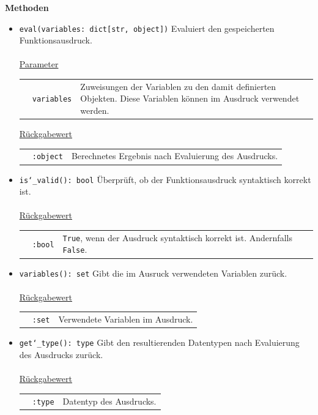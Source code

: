 \documentclass{article}
\begin{document}
\textbf{{Methoden}}
\begin{itemize}
\item \texttt{eval(variables: dict[str, object])} \newline Evaluiert den gespeicherten Funktionsausdruck.
\\\\
\underline{{Parameter}}

\begin{tabular}{lll}
 & \texttt{variables} & Zuweisungen der Variablen zu den damit definierten Objekten. Diese Variablen können im Ausdruck verwendet werden. \\
\end{tabular}

\underline{{Rückgabewert}}

\begin{tabular}{lll}
 & \texttt{:object} & Berechnetes Ergebnis nach Evaluierung des Ausdrucks. \\
\end{tabular}

\item \texttt{is\char`_valid(): bool} \newline Überprüft, ob der Funktionsausdruck syntaktisch korrekt ist.
\\\\
\underline{{Rückgabewert}}

\begin{tabular}{lll}
 & \texttt{:bool} & \texttt{True}, wenn der Ausdruck syntaktisch korrekt ist. Andernfalls \texttt{False}. \\
\end{tabular}

\item \texttt{variables(): set} \newline Gibt die im Ausruck verwendeten Variablen zurück.
\\\\
\underline{{Rückgabewert}}

\begin{tabular}{lll}
 & \texttt{:set} & Verwendete Variablen im Ausdruck. \\
\end{tabular}

\item \texttt{get\char`_type(): type} \newline Gibt den resultierenden Datentypen nach Evaluierung des Ausdrucks zurück.
\\\\
\underline{{Rückgabewert}}

\begin{tabular}{lll}
 & \texttt{:type} & Datentyp des Ausdrucks. \\
\end{tabular}
\end{itemize}
\end{document}
